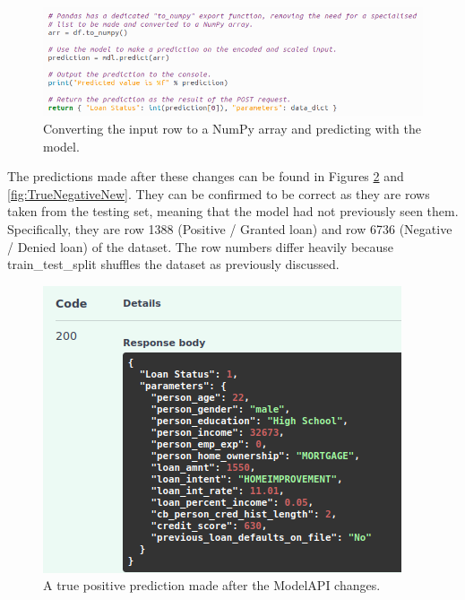 \documentclass[12pt]{report}
\begin{document}
\begin{figure}[H]
    \centering
    \includegraphics[width=\linewidth]{Implementation/JAN 10 UPDATES/NewUviPredict.png}
    \caption{Converting the input row to a NumPy array and predicting with the model.}
    \label{fig:NewUviPredict}
\end{figure}

\noindent The predictions made after these changes can be found in Figures \ref{fig:TruePositiveNew} and \ref{fig:TrueNegativeNew}. 
They can be confirmed to be correct as they are rows taken from the testing set, meaning that the model had not previously seen them. 
Specifically, they are row 1388 (Positive / Granted loan) and row 6736 (Negative / Denied loan) of the dataset.
The row numbers differ heavily because train\_test\_split shuffles the dataset as previously discussed.

\begin{figure}[H]
    \centering
    \includegraphics[width=.75\linewidth]{Implementation/JAN 10 UPDATES/NewTruePositiveOutput.png}
    \caption{A true positive prediction made after the ModelAPI changes.}
    \label{fig:TruePositiveNew}
\end{figure}
\end{document}
